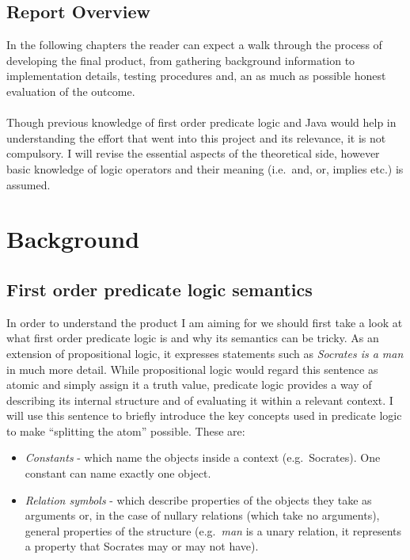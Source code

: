\documentclass{report}
\begin{document}
\section{Report Overview}
In the following chapters the reader can expect a walk through the process of 
developing the final product, from gathering background information to 
implementation details, testing procedures and, an as much as possible honest 
evaluation of the outcome. 
\\ \\
Though previous knowledge of first order predicate 
logic and Java would help in understanding the effort that went into this 
project and its relevance, it is not compulsory. I will revise the essential 
aspects of the theoretical side\cite{logicslides}, however basic knowledge of 
logic operators and their meaning (i.e.\ and, or, implies etc.) is assumed.


\chapter{Background}

\section{First order predicate logic semantics}
In order to understand the product I am aiming for we should first take a look 
at what first order predicate logic is and why its semantics can be tricky. As 
an extension of propositional logic, it expresses statements such as \emph{
Socrates is a man} in much more detail. While propositional logic would regard 
this sentence as atomic and simply assign it a truth value, predicate logic 
provides a way of describing its internal structure and of evaluating it within 
a relevant context. I will use this sentence to briefly introduce the key 
concepts used in predicate logic to make ``splitting the atom'' possible. 
These are:

  \begin{itemize}
  \item \emph{Constants} 
  - which name the objects inside a context (e.g.\ Socrates). One constant can 
  name exactly one object.
	\item \emph{Relation symbols}
  - which describe properties of the objects they take as arguments or, in the
  case of nullary relations (which take no arguments), general properties of the
  structure (e.g.\ \emph{man} is a unary relation, it represents a property that 
  Socrates may or may not have).
  \end{itemize}
\end{document}
